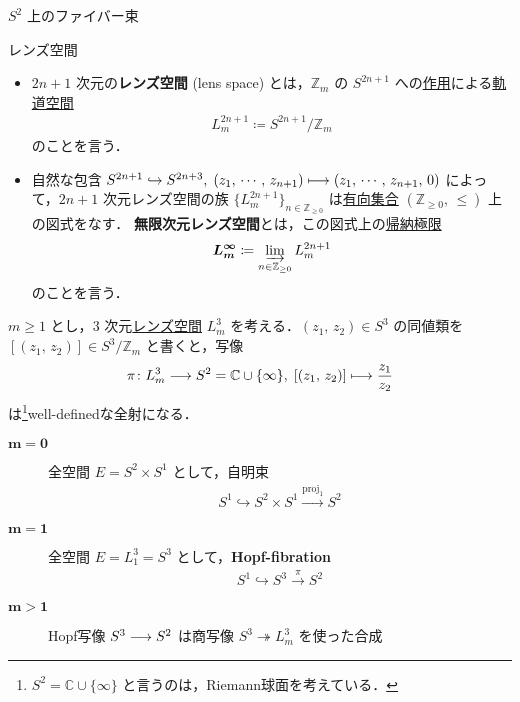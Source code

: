 \documentclass[algtopo_main]{subfiles}
\begin{document}
\begin{myexample}[]{$S^2$ 上のファイバー束}
    \begin{mydef}[label=def:lens]{レンズ空間}
        \begin{itemize}
            \item $2n+1$ 次元の\textbf{レンズ空間} (lens space) とは，$\mathbb{Z}_m$ の $S^{2n+1}$ への\hyperref[def:TG-action]{作用}による\hyperref[def:TG-action]{軌道空間}
            \begin{align}
                L_m^{2n+1} \coloneqq S^{2n+1}/\mathbb{Z}_m
            \end{align}
            のことを言う．
            \item 自然な包含 $S^{2n+1} \hookrightarrow S^{2n+3},\; (z_1,\, \cdots,\, z_{n+1}) \longmapsto (z_1,\, \cdots,\, z_{n+1},\, 0)$ によって，$2n+1$ 次元レンズ空間の族 $\bigl\{ L_m^{2n+1} \bigr\}_{n\in \mathbb{Z}_{\ge 0}}$ は\hyperref[def:directedSet]{有向集合} $(\mathbb{Z}_{\ge 0},\, \le)$ 上の図式をなす．
            \textbf{無限次元レンズ空間}とは，この図式上の\hyperref[prop:univ-indprojlim]{帰納極限}
            \begin{align}
                \bm{L^\infty_m} \coloneqq \varinjlim_{n \in \mathbb{Z}_{\ge 0}} L_m^{2n+1}
            \end{align}
            のことを言う．
        \end{itemize}
    \end{mydef}
    $m \ge 1$ とし，$3$ 次元\hyperref[def:lens]{レンズ空間} $L^3_m$ を考える．$(z_1,\, z_2) \in S^3$ の同値類を $[(z_1,\, z_2)] \in S^3 / \mathbb{Z}_m$ と書くと，写像
    \begin{align}
        \pi \colon L_m^3 \longrightarrow S^2 = \mathbb{C} \cup \{ \infty \},\; [(z_1,\, z_2)] \longmapsto \frac{z_1}{z_2}
    \end{align}
    は\footnote{$S^2 = \mathbb{C} \cup \{\infty\}$ と言うのは，Riemann球面を考えている．}well-definedな全射になる．
    \begin{description}
        \item[\textbf{$\bm{m=0}$}] 全空間 $E = S^2 \times S^1$ として，自明束
        \begin{align}
            S^1 \hookrightarrow S^2 \times S^1 \xrightarrow{\mathrm{proj}_1} S^2
        \end{align}
        \item[\textbf{$\bm{m=1}$}] 全空間 $E = L^3_1 = S^3$ として，\textbf{Hopf-fibration}
        \begin{align}
            S^1 \hookrightarrow S^3 \xrightarrow{\pi} S^2
        \end{align}
        \item[\textbf{$\bm{m > 1}$}] Hopf写像 $S^3 \longrightarrow S^2$ は商写像 $S^3 \twoheadrightarrow L^3_m$ を使った合成

\end{description}
\end{myexample}
\end{document}

